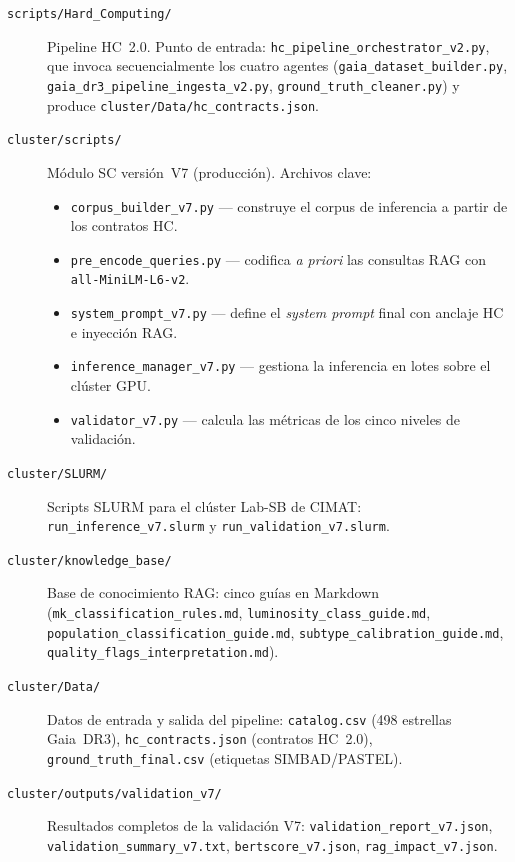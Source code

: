 \begin{description}
  \item[\texttt{scripts/Hard\_Computing/}]
    Pipeline HC~2.0. Punto de entrada:
    \texttt{hc\_pipeline\_orchestrator\_v2.py}, que invoca secuencialmente los
    cuatro agentes (\texttt{gaia\_dataset\_builder.py},
    \texttt{gaia\_dr3\_pipeline\_ingesta\_v2.py},
    \texttt{ground\_truth\_cleaner.py}) y produce
    \texttt{cluster/Data/hc\_contracts.json}.

  \item[\texttt{cluster/scripts/}]
    Módulo SC versión~V7 (producción). Archivos clave:
    \begin{itemize}
      \item \texttt{corpus\_builder\_v7.py} — construye el corpus de inferencia
        a partir de los contratos HC.
      \item \texttt{pre\_encode\_queries.py} — codifica \emph{a priori} las
        consultas RAG con \texttt{all-MiniLM-L6-v2}.
      \item \texttt{system\_prompt\_v7.py} — define el \emph{system prompt}
        final con anclaje HC e inyección RAG.
      \item \texttt{inference\_manager\_v7.py} — gestiona la inferencia en
        lotes sobre el clúster GPU.
      \item \texttt{validator\_v7.py} — calcula las métricas de los cinco
        niveles de validación.
    \end{itemize}

  \item[\texttt{cluster/SLURM/}]
    Scripts SLURM para el clúster Lab-SB de CIMAT:
    \texttt{run\_inference\_v7.slurm} y \texttt{run\_validation\_v7.slurm}.

  \item[\texttt{cluster/knowledge\_base/}]
    Base de conocimiento RAG: cinco guías en Markdown
    (\texttt{mk\_classification\_rules.md},
    \texttt{luminosity\_class\_guide.md},
    \texttt{population\_classification\_guide.md},
    \texttt{subtype\_calibration\_guide.md},
    \texttt{quality\_flags\_interpretation.md}).

  \item[\texttt{cluster/Data/}]
    Datos de entrada y salida del pipeline:
    \texttt{catalog.csv} (498 estrellas Gaia~DR3),
    \texttt{hc\_contracts.json} (contratos HC~2.0),
    \texttt{ground\_truth\_final.csv} (etiquetas SIMBAD/PASTEL).

  \item[\texttt{cluster/outputs/validation\_v7/}]
    Resultados completos de la validación V7:
    \texttt{validation\_report\_v7.json},
    \texttt{validation\_summary\_v7.txt},
    \texttt{bertscore\_v7.json},
    \texttt{rag\_impact\_v7.json}.


\end{description}
